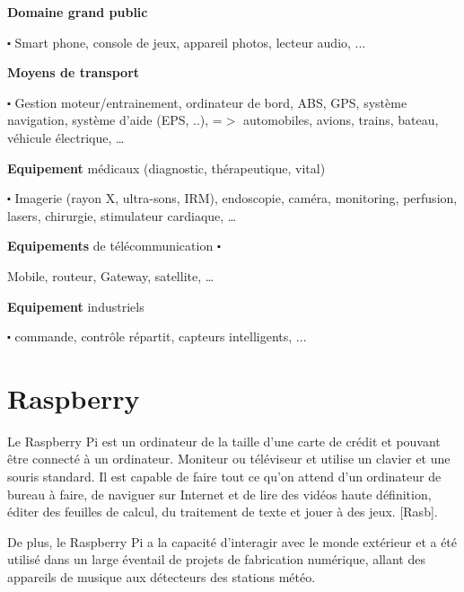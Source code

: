 \documentclass[12pt,a4paper]{report}
\begin{document}
\noindent \begin{flushleft}
	
	
	\noindent \textbf{Domaine grand public }
	
	$\mathrm{\centerdot}$ Smart phone, console de jeux, appareil photos, lecteur audio, ...  
	
	\noindent \textbf{Moyens de transport }
	
	\noindent $\mathrm{\centerdot}$ Gestion moteur/entrainement, ordinateur de bord, ABS, GPS, syst\`{e}me navigation, syst\`{e}me d'aide (EPS, ..), =$\mathrm{>}$ automobiles, avions, trains, bateau, v\'{e}hicule \'{e}lectrique, {\dots} 
	
	\noindent  \textbf{Equipement} m\'{e}dicaux (diagnostic, th\'{e}rapeutique, vital)
	
	\noindent  $\mathrm{\centerdot}$ Imagerie (rayon X, ultra-sons, IRM), endoscopie, cam\'{e}ra, monitoring, perfusion, lasers, chirurgie, stimulateur cardiaque, {\dots} 
	
	\noindent  \textbf{Equipements} de t\'{e}l\'{e}communication $\mathrm{\centerdot}$ 
	
	Mobile, routeur, Gateway, satellite, {\dots} 
	
	\noindent   \textbf{Equipement} industriels
	
	\noindent  $\mathrm{\centerdot}$ commande, contr\^{o}le r\'{e}partit, capteurs intelligents, ...
	
	\noindent  
	
	\noindent 
	
	\noindent 
	
	\section{Raspberry }
\end{flushleft}

\noindent Le Raspberry Pi est un ordinateur de la taille d'une carte de cr\'{e}dit et pouvant \^{e}tre connect\'{e} \`{a} un ordinateur. Moniteur ou t\'{e}l\'{e}viseur et utilise un clavier et une souris standard. Il est capable de faire tout ce qu'on attend d'un ordinateur de bureau \`{a} faire, de naviguer sur Internet et de lire des vid\'{e}os haute d\'{e}finition, \'{e}diter des feuilles de calcul, du traitement de texte et jouer \`{a} des jeux. [Rasb].

\noindent De plus, le Raspberry Pi a la capacit\'{e} d'interagir avec le monde ext\'{e}rieur et a \'{e}t\'{e} utilis\'{e} dans un large \'{e}ventail de projets de fabrication num\'{e}rique, allant des appareils de musique aux d\'{e}tecteurs des stations m\'{e}t\'{e}o.
\end{document}
